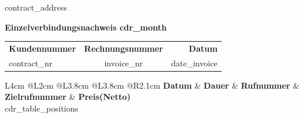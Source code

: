 \documentclass[version=last, fontsize=10pt, fromlogo=true, refline=wide, fromaddress=false, enlargefirstpage=true, numericaldate=true]{scrlttr2}
\begin{document}
	\begin{letter}{{contract\_address}}

		\opening{\textbf{\Large{Einzelverbindungsnachweis {cdr\_month}}}}

		\begin{flushleft}
			\begin{small}
				\renewcommand{\arraystretch}{1.1}
				\begin{tabular*}{\textwidth}{@{}l@{\extracolsep{\fill}}cr@{}}
					\textbf{\footnotesize{Kundennummer}} & \textbf{\footnotesize{Rechnungsnummer}} & \textbf{\footnotesize{Datum}} \\
					{contract\_nr} & {invoice\_nr} & {{date\_invoice}} \\
				\end{tabular*}
			\end{small}
		\end{flushleft}

		\hspace{0.1cm}

		\begin{center}
			\begin{scriptsize}
				\renewcommand{\arraystretch}{1.1}
				\begin{longtable}{L{4cm} @{}L{2cm} @{}L{3.8cm} @{}L{3.8cm} @{}R{2.1cm} } 		%
					\hline
					\hline
					\textbf{Datum}	& \textbf{Dauer} & \textbf{Rufnummer} & \textbf{Zielrufnummer} & \textbf{Preis(Netto)} \\
					\hline
					{cdr\_table\_positions}
					\hline
				\end{longtable}
			\end{scriptsize}
		\end{center}

	\end{letter}
\end{document}
